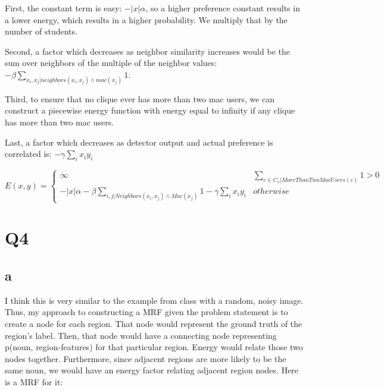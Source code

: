 \documentclass{article}
\begin{document}
First, the constant term is easy: $-|x| \alpha$, so a higher preference constant results 
in a lower energy, which results in a higher probability. We multiply that by 
the number of students.

Second, a factor which decreases as neighbor similarity increases would be the 
sum over neighbors of the multiple of the neighbor values: 
$-\beta \sum_{x_i, x_j | neighbors(x_i, x_j) \wedge mac(x_j) } 1$.

Third, to ensure that no clique ever has more than two mac users, we can 
construct a piecewise energy function with energy equal to infinity if any 
clique has more than two mac users.

Last, a factor which decreases as detector output and actual preference is correlated is: $-\gamma \sum_i x_i y_i$

$$
E(x, y) =
\begin{cases}
    \infty & \sum_{c \in C_x | MoreThanTwoMacUsers(c)} 1 > 0 \\
    -|x| \alpha - \beta \sum_{i, j | Neighbors(x_i, x_j) \wedge Mac(x_j) } 1 - \gamma \sum_i x_i y_i & otherwise
\end{cases}
$$

\section{Q4}

\subsection{a}

I think this is very similar to the example from class with a random, noisy 
image. Thus, my approach to constructing a MRF given the problem statement is 
to create a node for each region. That node would represent the ground truth of 
the region's label. Then, that node would have 
a connecting node representing p(noun, region-features) for that particular 
region. Energy would relate those two nodes together. Furthermore, since 
adjacent regions are more likely to be the same noun, we would have an energy 
factor relating adjacent region nodes. Here is a MRF for it:
\end{document}
